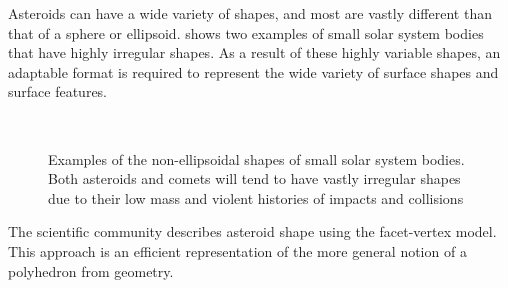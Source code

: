 Asteroids can have a wide variety of shapes, and most are vastly different than that of a sphere or ellipsoid.
 shows two examples of small solar system bodies that have highly irregular shapes.
As a result of these highly variable shapes, an adaptable format is required to represent the wide variety of surface shapes and surface features.
\begin{figure}[h]
    \centering
    ~
    \caption[Irregularly Shaped Asteroids]{Examples of the non-ellipsoidal shapes of small solar system bodies. Both asteroids and comets will tend to have vastly irregular shapes due to their low mass and violent histories of impacts and collisions~\label{fig:irregular_asteroids}}
\end{figure}
The scientific community describes asteroid shape using the facet-vertex model.
This approach is an efficient representation of the more general notion of a polyhedron from geometry.

